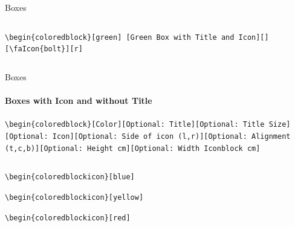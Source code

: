 \documentclass[aspectratio=169]{beamer}
\begin{document}
\begin{frame}{Boxes}
\begin{columns}
\begin{column}{0.49\textwidth}
            \begin{coloredblockicon}
                \footnotesize\texttt{\textbackslash begin\{coloredblock\}[green] [Green Box with Title and Icon][][\textbackslash faIcon\{bolt\}][r]}\strut
            \end{coloredblockicon}
        
        \end{column}
    \end{columns}

\end{frame}

\begin{frame}{Boxes}
    \framesubtitle{Boxes with Icon and without Title}

    \begin{coloredblock}[grey]
        \footnotesize\centering\texttt{\textbackslash begin\{coloredblock\}[Color][Optional:~Title][Optional:~Title~Size] [Optional:~Icon][Optional:~Side~of~icon (l,r)][Optional:~Alignment (t,c,b)][Optional:~Height~cm][Optional:~Width~Iconblock~cm]}
    \end{coloredblock}
        

    \vspace{-1cm}
    \begin{columns}
        \begin{column}{0.49\textwidth}

            \begin{coloredblockicon}
                \footnotesize\texttt{\textbackslash begin\{coloredblockicon\}[blue]}\strut
            \end{coloredblockicon}
    
            \begin{coloredblockicon}
                \footnotesize\texttt{\textbackslash begin\{coloredblockicon\}[yellow]}\strut
            \end{coloredblockicon}
    
            \begin{coloredblockicon}
                \footnotesize\texttt{\textbackslash begin\{coloredblockicon\}[red]}\strut
            \end{coloredblockicon}

        \end{column}
        \begin{column}{0.49\textwidth}
        

\end{column}
\end{columns}
\end{frame}
\end{document}
